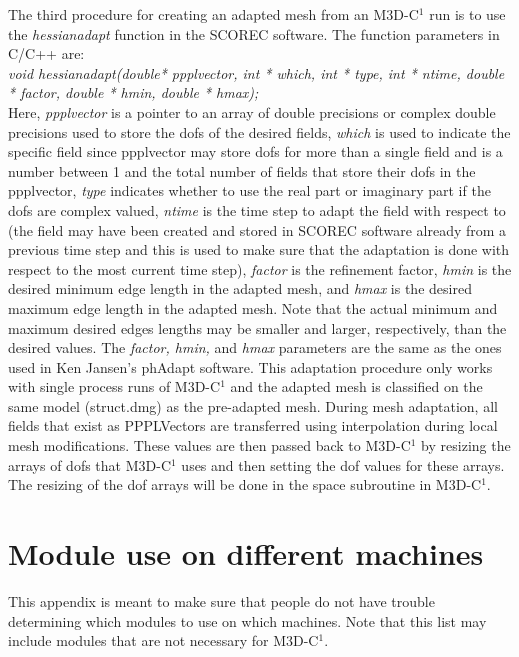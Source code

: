 The third procedure for creating an adapted mesh from an M3D-C$^1$ run is to use the 
\textit{hessianadapt} function in the SCOREC software.  The function parameters in C/C++ are:\\
\textit{void hessianadapt(double* ppplvector, int * which, int * type, int * ntime, double * factor, double * hmin, double * hmax);}\\
Here, \textit{ppplvector} is a pointer to an array of double precisions or complex double precisions
used to store the dofs of the desired fields, \textit{which} is used to indicate the specific field
since ppplvector may store dofs for more than a single field and is a number between 1 and the total
number of fields that store their dofs in the ppplvector, 
\textit{type} indicates whether to use the real part or imaginary part if the dofs are complex valued, 
\textit{ntime} is the time step to adapt the field with respect to (the field may have been created
and stored in SCOREC software already from a previous time step and this is used to make sure that
the adaptation is done with respect to the most current time step),
\textit{factor} is the refinement factor, \textit{hmin} is the desired minimum edge length in the adapted mesh, 
and \textit{hmax} is the desired maximum edge length in the adapted mesh.  Note that the actual
minimum and maximum desired edges lengths may be smaller and larger, respectively, than the
desired values.  The \textit{factor, hmin,} and \textit{hmax} parameters are the same as the ones
used in Ken Jansen's phAdapt software.  This adaptation procedure only works with single process
runs of M3D-C$^1$ and the adapted mesh is classified on the same model (struct.dmg) 
as the pre-adapted mesh.  During mesh adaptation, all fields that exist as PPPLVectors are transferred
using interpolation during local mesh modifications.  These values are then passed back to M3D-C$^1$ by
resizing the arrays of dofs that M3D-C$^1$ uses and then setting the dof values for these arrays.  
The resizing of the dof arrays will be done in the space subroutine in M3D-C$^1$.


\chapter{Module use on different machines}
This appendix is meant to make sure that people do not have trouble determining which modules to use on 
which machines.  Note that this list may include modules that are not necessary for M3D-C$^1$.

